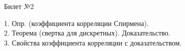 \documentclass[preview]{standalone}
\begin{document}
 
\begin{center} {\Large Билет №2} \end{center} 

1.  Опр. (коэффициента корреляции Спирмена).\\

2.  Теорема (свертка для дискретных).  Доказательство.\\

3.  Свойства коэффициента корреляции с доказательством.\\
\end{document}
